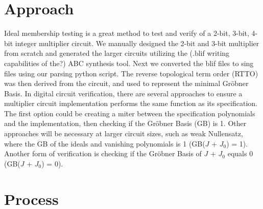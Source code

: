\documentclass[conference]{IEEEtran}
\begin{document}
\section{Approach}
Ideal membership testing is a great method to test and verify of a 2-bit, 3-bit, 4-bit integer multiplier circuit.
We manually designed the 2-bit and 3-bit multiplier from scratch and generated the larger circuits utilizing the (.blif writing capabilities of the?) ABC synthesis tool. Next we
converted the blif files to sing files using our parsing python script. The reverse topological term order (RTTO) was then derived from the circuit, and used to
represent the minimal Gröbner Basis. In digital circuit verification, there are several approaches to ensure a multiplier circuit implementation performs the same function as its specification. The first 
option could be creating a miter between the specification polynomials and the implementation, then checking if the Gröbner Basis (GB) is 1. Other approaches will be necessary at larger circuit sizes, 
such as weak Nullensatz, where the GB of the ideals and vanishing polynomials is 1 (GB($J$ + $J_{0}$) = 1). Another form of verification is checking if the Gröbner Basis of 
$J$ + $J_{0}$ equals 0 (GB($J$ + $J_{0}$) = 0).

\section{Process}
\end{document}
